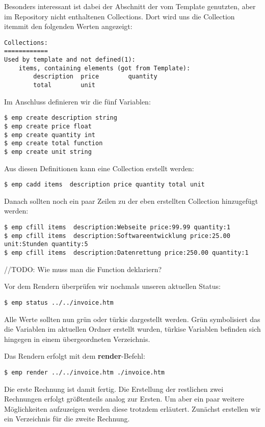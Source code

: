 Besonders interessant ist dabei der Abschnitt der vom Template genutzten, aber im Repository nicht enthaltenen Collections. Dort wird uns die Collection \grqq item\grqq mit den folgenden Werten angezeigt:

\begin{lstlisting}[style=Bash]
Collections:
============
Used by template and not defined(1):
	items, containing elements (got from Template):
		description  price        quantity
		total        unit
\end{lstlisting}

Im Anschluss definieren wir die fünf Variablen:
\begin{lstlisting}[style=Bash]
$ emp create description string
$ emp create price float
$ emp create quantity int
$ emp create total function
$ emp create unit string
\end{lstlisting}

Aus diesen Definitionen kann eine Collection erstellt werden:
\begin{lstlisting}[style=Bash]
$ emp cadd items  description price quantity total unit
\end{lstlisting}

Danach sollten noch ein paar Zeilen zu der eben erstellten Collection hinzugefügt werden:
\begin{lstlisting}[style=Bash]
$ emp cfill items  description:Webseite price:99.99 quantity:1
$ emp cfill items  description:Softwareentwicklung price:25.00 unit:Stunden quantity:5
$ emp cfill items  description:Datenrettung price:250.00 quantity:1
\end{lstlisting}
//TODO: Wie muss man die Function deklariern?

Vor dem Rendern überprüfen wir nochmals unseren aktuellen Status:
\begin{lstlisting}[style=Bash]
$ emp status ../../invoice.htm
\end{lstlisting}
Alle Werte sollten nun grün oder türkis dargestellt werden. Grün symbolisiert das die Variablen im aktuellen Ordner erstellt wurden, türkise Variablen befinden sich hingegen in einem übergeordneten Verzeichnis.

Das Rendern erfolgt mit dem \textbf{render}-Befehl:
\begin{lstlisting}[style=Bash]
$ emp render ../../invoice.htm ./invoice.htm
\end{lstlisting}

Die erste Rechnung ist damit fertig. Die Erstellung der restlichen zwei Rechnungen erfolgt größtenteils analog zur Ersten. Um aber ein paar weitere Möglichkeiten aufzuzeigen werden diese trotzdem erläutert.
Zunächst erstellen wir ein Verzeichnis für die zweite Rechnung.

